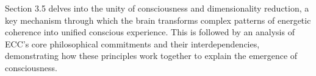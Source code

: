 Section 3.5 delves into the unity of consciousness and dimensionality reduction, a key mechanism through which the brain transforms complex patterns of energetic coherence into unified conscious experience. This is followed by an analysis of ECC's core philosophical commitments and their interdependencies, demonstrating how these principles work together to explain the emergence of consciousness.
